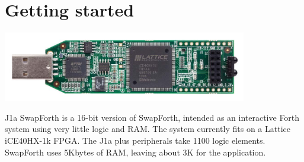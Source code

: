 \documentclass[10pt]{book}
\begin{document}
% 
% 
% 
% 


\endgroup

\thispagestyle{empty}
\pagestyle{headings}

\tableofcontents

\chapter{Getting started}

\begin{center}
\includegraphics[width=0.8\textwidth]{iCEstick.jpg}
\end{center}

J1a SwapForth is a 16-bit version of SwapForth,
intended as an interactive Forth system using very little logic and RAM.
The system currently fits on a Lattice iCE40HX-1k FPGA.
The J1a plus peripherals take 1100 logic elements.
SwapForth uses 5Kbytes of RAM, leaving about 3K for the application.
\end{document}
